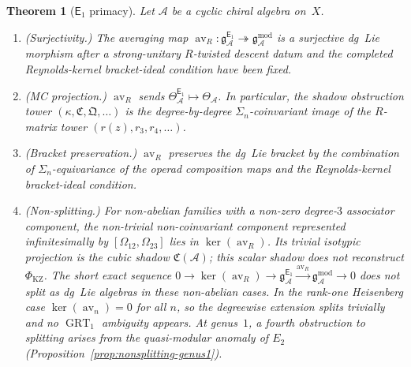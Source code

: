\documentclass[11pt,reqno]{amsart}
\newtheorem{theorem}{Theorem}[section]
\theoremstyle{definition}
\theoremstyle{remark}
\newcommand{\cA}{\mathcal{A}}
\newcommand{\Eone}{\mathsf{E}_{1}}
\DeclareMathOperator{\av}{av}
\DeclareMathOperator{\GRT}{GRT}
\newcommand{\gmod}{\mathfrak{g}^{\mathrm{mod}}_{\cA}}
\newcommand{\gEone}{\mathfrak{g}^{\Eone}_{\cA}}
\numberwithin{equation}{section}
\begin{document}
\begin{theorem}[$\Eone$ primacy]
\label{thm:e1-primacy-main}
Let $\cA$ be a cyclic chiral algebra on~$X$.
\begin{enumerate}[label=\textup{(\roman*)}]
\item \textup{(Surjectivity.)}
  The averaging map
  $\av_R\colon \gEone \twoheadrightarrow \gmod$
  is a surjective dg~Lie morphism after a strong-unitary
  \(R\)-twisted descent datum and the completed Reynolds-kernel
  bracket-ideal condition have been fixed.

\item \textup{(MC projection.)}
  $\av_R$ sends
  $\Theta^{\Eone}_\cA \mapsto \Theta_\cA$.
  In particular, the shadow obstruction tower
  $(\kappa, \mathfrak{C}, \mathfrak{Q}, \ldots)$
  is the degree-by-degree $\Sigma_n$-coinvariant image of the
  $R$-matrix tower $(r(z), r_3, r_4, \ldots)$.

\item \textup{(Bracket preservation.)}
  $\av_R$ preserves the dg~Lie bracket by the combination of
  $\Sigma_n$-equivariance of the operad composition maps and the
  Reynolds-kernel bracket-ideal condition.

\item \textup{(Non-splitting.)}
  For non-abelian families with a non-zero degree-$3$ associator
  component, the non-trivial non-coinvariant component represented
  infinitesimally by $[\Omega_{12},\Omega_{23}]$ lies in
  $\ker(\av_R)$. Its trivial isotypic projection is the cubic shadow
  $\mathfrak C(\cA)$; this scalar shadow does not reconstruct
  $\Phi_{\mathrm{KZ}}$. The short
  exact sequence
  $0 \to \ker(\av_R) \to \gEone
  \xrightarrow{\av_R} \gmod \to 0$
  does not split as dg~Lie algebras in these non-abelian cases. In
  the rank-one Heisenberg case $\ker(\av_n)=0$ for all $n$, so the
  degreewise extension splits trivially and no $\GRT_1$ ambiguity
  appears. At genus~$1$, a fourth
  obstruction to splitting arises from the quasi-modular anomaly
  of $E_2$ (Proposition~\textup{\ref{prop:nonsplitting-genus1}}).
\end{enumerate}
\end{theorem}
\end{document}
